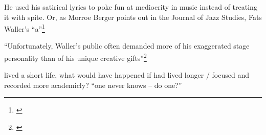 \documentclass[11pt]{report}
\begin{document}
	He used his satirical lyrics to poke fun at mediocrity in music instead of treating it with spite. Or, as Morroe Berger points out in the Journal of Jazz Studies, Fats Waller's ``a''\footnote{\cite[4]{outside-insider}}


	\label{sec:conclusion}

	``Unfortunately, Waller's public often demanded more of his exaggerated stage personality than of his unique creative gifts''\footnote{\cite[40]{grove-book:waller}}

	lived a short life, what would have happened if had lived longer / focused and recorded more academicly? ``one never knows -- do one?''



\end{document}
